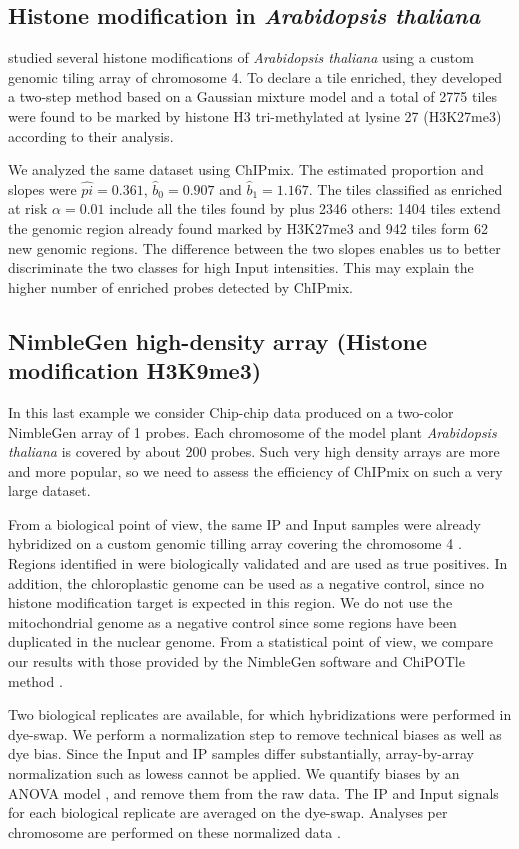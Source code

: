 \documentclass{llncs}
\begin{document}
\subsection{Histone modification in \textit{Arabidopsis thaliana}}
\cite{Turck07} studied several histone modifications of
\textit{Arabidopsis thaliana} using a custom genomic tiling array of
chromosome 4. To declare a tile enriched, they developed a two-step
method based on a Gaussian mixture model and a total of 2775 tiles
were found to be marked by histone H3 tri-methylated at lysine 27
(H3K27me3) according to their analysis.

We analyzed the same dataset using ChIPmix. The estimated proportion
and slopes were $\widehat{pi}=0.361$, $\widehat{b}_0=0.907$ and
$\widehat{b}_1=1.167$. The tiles classified as enriched at risk
$\alpha=0.01$ include all the tiles found by \cite{Turck07} plus
2346 others: 1404 tiles extend the genomic region already found
marked by H3K27me3 and 942 tiles form 62 new genomic regions. The
difference between the two slopes enables us to better discriminate
the two classes for high Input intensities. This may explain the
higher number of enriched probes detected by ChIPmix.


\subsection{NimbleGen high-density array (Histone modification H3K9me3)}
In this last example we consider Chip-chip data produced on a
two-color NimbleGen array of 1 probes. Each chromosome of
the model plant \textit{Arabidopsis thaliana} is covered by about
200 probes. Such very high density arrays are more and more
popular, so we need to assess the efficiency of ChIPmix on such a
very large dataset.

From a biological point of view, the same IP and Input samples were
already hybridized on a custom genomic tilling array covering the
chromosome 4 \cite{Turck07}. Regions identified in \cite{Turck07}
were biologically validated and are used as true positives. In
addition, the chloroplastic genome can be used as a negative
control, since no histone modification target is expected in this
region. We do not use the mitochondrial genome as a negative control
since some regions have been duplicated in the nuclear genome.
From a statistical point of view, we compare our
results with those provided by the NimbleGen software and ChiPOTle method \cite{BuckNobelLieb05}. \\
{\par} Two biological replicates are available, for which
hybridizations were performed in dye-swap. We perform a
normalization step to remove technical biases as well as dye bias.
Since the Input and IP samples differ substantially, array-by-array
normalization such as lowess cannot be applied.  We quantify biases
by an ANOVA model \cite{Kerr02}, and remove them from the raw data.
The IP and Input signals for each biological replicate are averaged
on the dye-swap. Analyses per chromosome are performed on these
normalized data .
\end{document}

